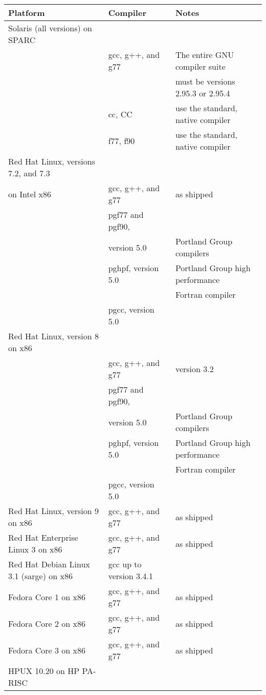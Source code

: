 \begin{center}
\begin{table}[hbt]
\begin{tabular}{|ll|l|}
\textbf{Platform} & \textbf{Compiler} & \textbf{Notes}\\ \hline \hline
Solaris (all versions) on SPARC \\ 
& gcc, g++, and g77 & The entire GNU compiler suite \\
& & must be versions 2.95.3 or 2.95.4 \\ 
& cc, CC & use the standard, native compiler \\ 
& f77, f90 & use the standard, native compiler \\ 
\hline
Red Hat Linux, versions 7.2, and 7.3 \\
on Intel x86 & gcc, g++, and g77 & as shipped \\ 
& pgf77 and pgf90, \\
& version 5.0 & Portland Group compilers \\ 
& pghpf, version 5.0 & Portland Group high performance \\
& & Fortran compiler \\ 
& pgcc, version 5.0 \\ 
\hline
Red Hat Linux, version 8 on x86 \\ 
& gcc, g++, and g77 & version 3.2 \\ 
& pgf77 and pgf90, \\
& version 5.0 & Portland Group compilers \\ 
& pghpf, version 5.0 & Portland Group high performance \\
& & Fortran compiler \\ 
& pgcc, version 5.0 \\ 
\hline
Red Hat Linux, version 9 on x86 & gcc, g++, and g77 & as shipped  \\ 
\hline
Red Hat Enterprise Linux 3 on x86 & gcc, g++, and g77 & as shipped  \\ 
\hline
Red Hat Debian Linux 3.1 (sarge) on x86 & gcc up to version 3.4.1 \\ 
\hline
Fedora Core 1 on x86 & gcc, g++, and g77 & as shipped  \\ 
\hline
Fedora Core 2 on x86 & gcc, g++, and g77 & as shipped  \\ 
\hline
Fedora Core 3 on x86 & gcc, g++, and g77 & as shipped  \\ 
\hline
HPUX 10.20 on HP PA-RISC \\

\end{tabular}
\end{table}
\end{center}
